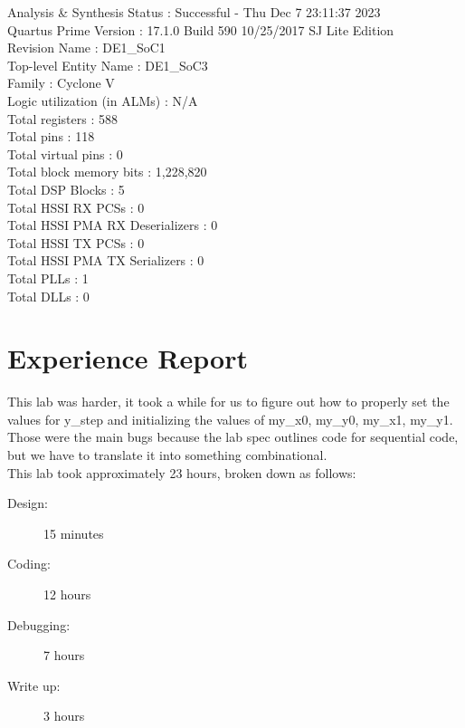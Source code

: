 \documentclass[11pt, titlepage]{article}
\begin{document}
            Analysis \& Synthesis Status : Successful - Thu Dec  7 23:11:37 2023 \\
            Quartus Prime Version : 17.1.0 Build 590 10/25/2017 SJ Lite Edition \\
            Revision Name : DE1\_SoC1 \\
            Top-level Entity Name : DE1\_SoC3 \\
            Family : Cyclone V \\
            Logic utilization (in ALMs) : N/A \\
            Total registers : 588 \\
            Total pins : 118 \\
            Total virtual pins : 0 \\
            Total block memory bits : 1,228,820 \\
            Total DSP Blocks : 5 \\
            Total HSSI RX PCSs : 0 \\
            Total HSSI PMA RX Deserializers : 0 \\
            Total HSSI TX PCSs : 0 \\
            Total HSSI PMA TX Serializers : 0 \\
            Total PLLs : 1 \\
            Total DLLs : 0 \\
            
    \newpage
    \section{Experience Report}
        This lab was harder, it took a while for us to figure out how to properly set the values for y\_step and initializing the values of my\_x0, my\_y0, my\_x1, my\_y1. Those were the main bugs because the lab spec outlines code for sequential code, but we have to translate it into something combinational. \\

        This lab took approximately 23 hours, broken down as follows:
        \begin{description}
            \item[Design:] 15 minutes
            \item[Coding:] 12 hours
            \item[Debugging:] 7 hours
            \item[Write up:] 3 hours
        \end{description}   
        
\end{document}
